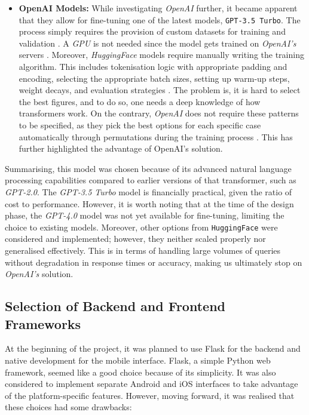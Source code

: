 \begin{itemize}
    \item \textbf{OpenAI Models:} While investigating \textit{OpenAI} further, it became apparent that they allow for fine-tuning one of the latest models, \texttt{GPT-3.5 Turbo}. The process simply requires the provision of custom datasets for training and validation \cite{LatifEtAl2024, OpenAIDocumentation2023}. A \textit{GPU} is not needed since the model gets trained on \textit{OpenAI's} servers \cite{ChatGPTFineTuning2024, OpenAIDocumentation2023}. Moreover, \textit{HuggingFace} models require manually writing the training algorithm. This includes tokenisation logic with appropriate padding and encoding, selecting the appropriate batch sizes, setting up warm-up steps, weight decays, and evaluation strategies \cite{NarayananEtAl2023}. The problem is, it is hard to select the best figures, and to do so, one needs a deep knowledge of how transformers work. On the contrary, \textit{OpenAI} does not require these patterns to be specified, as they pick the best options for each specific case automatically through permutations during the training process \cite{OpenAIDocumentation2023}. This has further highlighted the advantage of OpenAI's solution.
\end{itemize}

Summarising, this model was chosen because of its advanced natural language processing capabilities compared to earlier versions of that transformer, such as \textit{GPT-2.0}. The \textit{GPT-3.5 Turbo} model is financially practical, given the ratio of cost to performance. However, it is worth noting that at the time of the design phase, the \textit{GPT-4.0} model was not yet available for fine-tuning, limiting the choice to existing models. Moreover, other options from \texttt{HuggingFace} were considered and implemented; however, they neither scaled properly nor generalised effectively. This is in terms of handling large volumes of queries without degradation in response times or accuracy, making us ultimately stop on \textit{OpenAI's} solution.  
        
\subsection{Selection of Backend and Frontend Frameworks}

At the beginning of the project, it was planned to use Flask for the backend and native development for the mobile interface. Flask, a simple Python web framework, seemed like a good choice because of its simplicity. It was also considered to implement separate Android and iOS interfaces to take advantage of the platform-specific features. However, moving forward, it was realised that these choices had some drawbacks:

